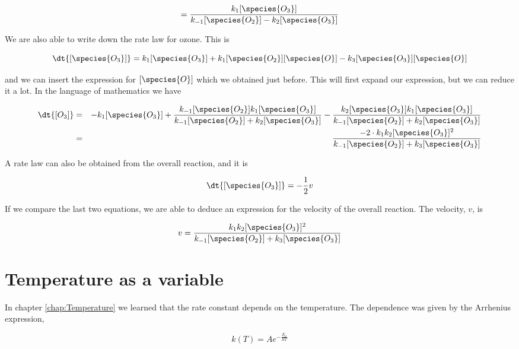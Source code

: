\begin{equation}
    [\species{O}] = \frac{k_1[\species{O_3}]}{k_{-1}[\species{O_2}] - k_2[\species{O_3}]}
\end{equation}

We are also able to write down the rate law for ozone. This is

\begin{equation}
    \dt{[\species{O_3}]} = k_1[\species{O_3}] + k_1[\species{O_2}][\species{O}] - k_3[\species{O_3}][\species{O}]
\end{equation}

and we can insert the expression for $[\species{O}]$ which we obtained just before. This will first expand our expression, but we can reduce it a lot. In the language of mathematics we have

\begin{eqnarray}
    \dt{[O_3]} &=& -k_1[\species{O_3}] + \frac{k_{-1}[\species{O_2}]k_1[\species{O_3}]}{k_{-1}[\species{O_2}] + k_2[\species{O_3}]} - \frac{k_2[\species{O_3}]k_1[\species{O_3}]}{k_{-1}[\species{O_2}] + k_2[\species{O_3}]} \\ \nonumber
               &=& \frac{-2\cdot k_1k_2[\species{O_3}]^2}{k_{-1}[\species{O_2}] + k_3[\species{O_3}]}
\end{eqnarray}

A rate law can also be obtained from the overall reaction, and it is

\begin{equation}
    \dt{[\species{O_3}]} = -\frac{1}{2}v
\end{equation}

If we compare the last two equations, we are able to deduce an expression for the velocity of the overall reaction. The velocity, $v$, is

\begin{equation}
    v = \frac{k_1k_2[\species{O_3}]^2}{k_{-1}[\species{O_2}] + k_3[\species{O_3}]}
\end{equation}

\section{Temperature as a variable}

In chapter \ref{chap:Temperature} we learned that the rate constant depends on the temperature. The dependence was given by the Arrhenius expression, \ie

\begin{equation}
    k(T) = Ae^{-\frac{E_a}{RT}}
\end{equation}

